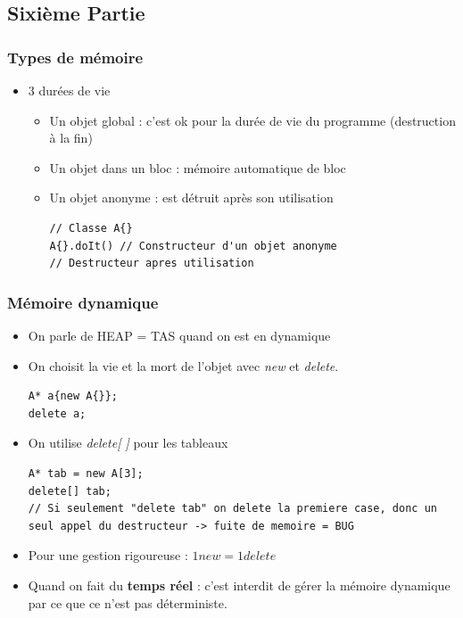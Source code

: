 \documentclass[12pt,a4paper]{article}
\begin{document}
\subsection{Sixième Partie}
\subsubsection{Types de mémoire}
\begin{itemize}
\item 3 durées de vie
\begin{itemize}
\item Un objet global : c'est ok pour la durée de vie du programme (destruction à la fin)
\item Un objet dans un bloc : mémoire automatique de bloc
\item Un objet anonyme : est détruit après son utilisation
\begin{lstlisting}
// Classe A{}
A{}.doIt() // Constructeur d'un objet anonyme
// Destructeur apres utilisation
\end{lstlisting}
\end{itemize}
\end{itemize}
\subsubsection{Mémoire dynamique}
\begin{itemize}
\item On parle de HEAP = TAS quand on est en dynamique
\item On choisit la vie et la mort de l'objet avec \textit{new} et \textit{delete}.
\begin{lstlisting}
A* a{new A{}};
delete a;
\end{lstlisting}
\item On utilise \textit{delete[ ]} pour les tableaux
\begin{lstlisting}
A* tab = new A[3];
delete[] tab;
// Si seulement "delete tab" on delete la premiere case, donc un seul appel du destructeur -> fuite de memoire = BUG
\end{lstlisting}
\item Pour une gestion rigoureuse : $1 new = 1 delete$
\item Quand on fait du \textbf{temps réel} : c'est interdit de gérer la mémoire dynamique par ce que ce n'est pas déterministe.
\end{itemize}
\end{document}

